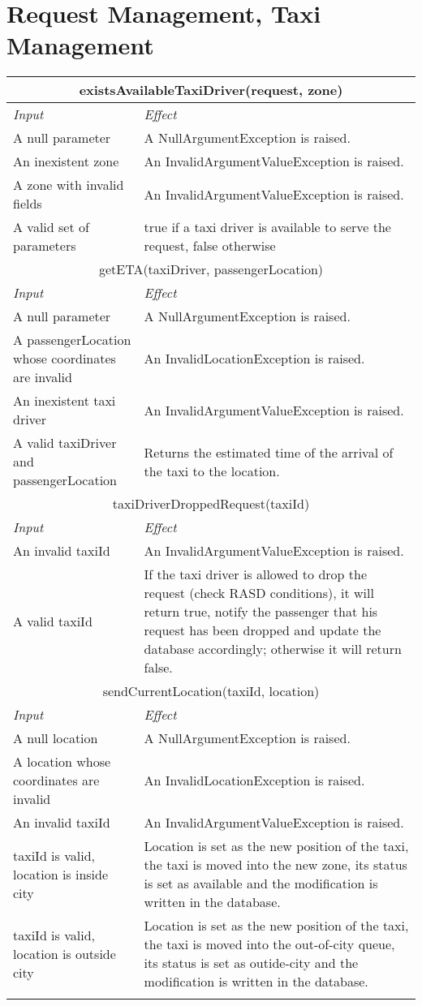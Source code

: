 \documentclass[11pt,oneside,a4paper]{report}
\newcommand{\method}[1]{\multicolumn{2}{|c|}{{#1}}\\\hline
	\textit{Input} & \textit{Effect} \\\hline}
\begin{document}
\section{Request Management, Taxi Management}
\begin{tabular}{p{5cm}|p{6cm}}
\hline
	\method{existsAvailableTaxiDriver(request, zone)}
	A null parameter &
	A NullArgumentException is raised. \\\hline
	An inexistent zone &
	An InvalidArgumentValueException is raised. \\\hline
	A zone with invalid fields &
	An InvalidArgumentValueException  is raised. \\\hline
	A valid set of parameters &
	true if a taxi driver is available to serve the request, false otherwise \\\hline\hline
	
	\method{getETA(taxiDriver, passengerLocation)}
	A null parameter &
	A NullArgumentException is raised. \\\hline
	A passengerLocation whose coordinates are invalid &
	An InvalidLocationException is raised. \\\hline
	An inexistent taxi driver &
	An InvalidArgumentValueException is raised. \\\hline
	A valid taxiDriver and passengerLocation &
	Returns the estimated time of the arrival of the taxi to the location. \\\hline\hline

	\method{taxiDriverDroppedRequest(taxiId)}
	An invalid taxiId &
	An InvalidArgumentValueException is raised. \\\hline
	A valid taxiId &
	If the taxi driver is allowed to drop the request (check RASD conditions), it will return true, notify the passenger that his request has been dropped and update the database accordingly; otherwise it will return false.  \\\hline\hline
	
	\method{sendCurrentLocation(taxiId, location)}
	A null location &
	A NullArgumentException is raised. \\\hline
	A location whose coordinates are invalid &
	An InvalidLocationException is raised. \\\hline
	An invalid taxiId &
	An InvalidArgumentValueException is raised. \\\hline
	taxiId is valid, location is inside city&
	Location is set as the new position of the taxi, the taxi is moved into the new zone, its status is set as available and the modification is written in the database.\\\hline
	taxiId is valid, location is outside city&
	Location is set as the new position of the taxi, the taxi is moved into the out-of-city queue, its status is set as outide-city and the modification is written in the database. \\\hline\\\hline
\end{tabular}
\end{document}
